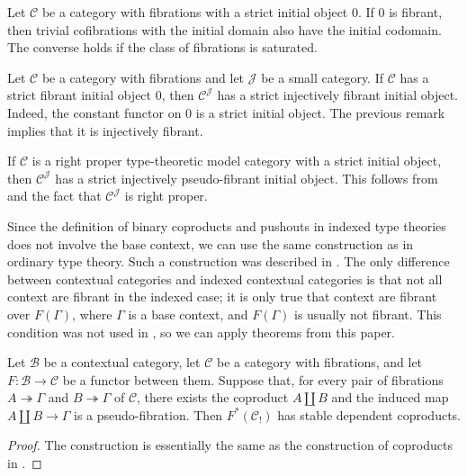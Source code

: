 \documentclass[reqno]{amsart}
\theoremstyle{definition}
\theoremstyle{remark}
\newcommand{\scat}[1]{\mathcal{#1}}
\numberwithin{figure}{section}
\begin{document}
\begin{remark}
Let $\scat{C}$ be a category with fibrations with a strict initial object $0$.
If $0$ is fibrant, then trivial cofibrations with the initial domain also have the initial codomain.
The converse holds if the class of fibrations is saturated.
\end{remark}

\begin{example}
Let $\scat{C}$ be a category with fibrations and let $\scat{J}$ be a small category.
If $\scat{C}$ has a strict fibrant initial object $0$, then $\scat{C}^\scat{J}$ has a strict injectively fibrant initial object.
Indeed, the constant functor on $0$ is a strict initial object.
The previous remark implies that it is injectively fibrant.
\end{example}

\begin{example}
If $\scat{C}$ is a right proper type-theoretic model category with a strict initial object, then $\scat{C}^\scat{J}$ has a strict injectively pseudo-fibrant initial object.
This follows from  and the fact that $\scat{C}^\scat{J}$ is right proper.
\end{example}

Since the definition of binary coproducts and pushouts in indexed type theories does not involve the base context, we can use the same construction as in ordinary type theory.
Such a construction was described in \cite{lum-shul-hits}.
The only difference between contextual categories and indexed contextual categories is that not all context are fibrant in the indexed case;
it is only true that context are fibrant over $F(\Gamma)$, where $\Gamma$ is a base context, and $F(\Gamma)$ is usually not fibrant.
This condition was not used in \cite{lum-shul-hits}, so we can apply theorems from this paper.

\begin{prop}
Let $\scat{B}$ be a contextual category, let $\scat{C}$ be a category with fibrations, and let $F : \scat{B} \to \scat{C}$ be a functor between them.
Suppose that, for every pair of fibrations $A \twoheadrightarrow \Gamma$ and $B \twoheadrightarrow \Gamma$ of $\scat{C}$,
there exists the coproduct $A \amalg B$ and the induced map $A \amalg B \to \Gamma$ is a pseudo-fibration.
Then $F^*(\scat{C}_!)$ has stable dependent coproducts.
\end{prop}
\begin{proof}
The construction is essentially the same as the construction of coproducts in \cite[Theorem~3.3]{lum-shul-hits}.
\end{proof}
\end{document}
